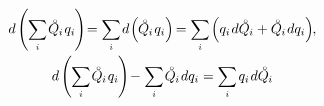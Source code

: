 \begin{otherlanguage}{russian}
\nopagebreak\vspace{-0.2em}\begin{equation*}
\begin{array}{c}\small
d \hspace{-0.1ex} \left( \hspace{-0.1ex} \scalebox{0.95}[1]{$\displaystyle \sum_{\smash{i}}$} \hspace{.2ex} \mathcircabove{Q}_{\hspace{-0.1ex}i} \hspace{.2ex} q_i \hspace{-0.12ex} \right) \hspace{-0.5ex}
= \scalebox{0.95}[1]{$\displaystyle \sum_{\smash{i}}$} \hspace{.25ex} d \hspace{-0.25ex} \left( \hspace{-0.1ex} \mathcircabove{Q}_{\hspace{-0.1ex}i} \hspace{.2ex} q_i \right) \hspace{-0.3ex}
= \scalebox{0.95}[1]{$\displaystyle \sum_{\smash{i}}$} \hspace{-0.16ex} \left(
q_i \hspace{.2ex} d \mathcircabove{Q}_{\hspace{-0.1ex}i}
+ \mathcircabove{Q}_{\hspace{-0.1ex}i} \hspace{.2ex} dq_i \right)
\hspace{-0.64ex} ,
\\[1.25em]
%
\small
d \hspace{-0.1ex} \left( \hspace{-0.1ex} \scalebox{0.95}[1]{$\displaystyle \sum_{\smash{i}}$} \hspace{.2ex} \mathcircabove{Q}_{\hspace{-0.1ex}i} \hspace{.2ex} q_i \hspace{-0.12ex} \right) \hspace{-0.4ex}
- \hspace{.1ex} \tikzmark{beginLegendreOfPotential} \scalebox{0.95}[1]{$\displaystyle \sum_{\smash{i}}$} \hspace{.2ex} \mathcircabove{Q}_{\hspace{-0.1ex}i} \hspace{.2ex} dq_i \tikzmark{endLegendreOfPotential}
= \scalebox{0.95}[1]{$\displaystyle \sum_{\smash{i}}$} \hspace{.32ex} q_i \hspace{.2ex} d\mathcircabove{Q}_{\hspace{-0.1ex}i}

\end{array}
\end{equation*}
\end{otherlanguage}
